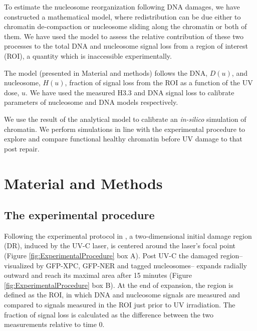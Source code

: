 \documentclass[12pt]{article}
\begin{document}
	To estimate the nucleosome reorganization following DNA damages, we have
	constructed a mathematical model, where redistribution can be due either to chromatin de-compaction or nucleosome sliding along the chromatin or both of them. We have used the model to assess the relative contribution of these two processes to the total DNA and nucleosome signal loss from a region of interest (ROI), a quantity which is inaccessible experimentally.
	
	The model (presented in Material and methods) follows the DNA, $D(u)$,
	and nucleosome, $H(u)$, fraction of signal loss from the ROI as a function of
	the UV dose, $u$. We have used the measured H3.3 and DNA signal loss to
	calibrate parameters of nucleosome and DNA models respectively.
	
	We use the result of the analytical model to calibrate an \textit{in-silico} simulation of chromatin. We perform simulations in line with the experimental procedure to explore and compare functional healthy chromatin before UV damage to that post repair. %
		
 \section{Material and Methods} 

 \subsection{The experimental procedure}
	Following the experimental protocol in \cite{adam2015imaging}, a two-dimensional initial damage region (DR), induced by the UV-C laser, is centered around the laser's focal point (Figure \ref{fig:ExperimentalProcedure} box A). Post UV-C the damaged region-- visualized by GFP-XPC, GFP-NER and tagged nucleosomes-- expands radially outward and reach its maximal area after 15 minutes (Figure \ref{fig:ExperimentalProcedure} box B). At the end of expansion, the region is defined as the ROI, in which DNA and nucleosome signals are measured and compared to signals measured in the ROI just prior to UV irradiation. The fraction of signal loss is calculated as the difference between the two measurements relative to time 0.
	
	
\end{document}
